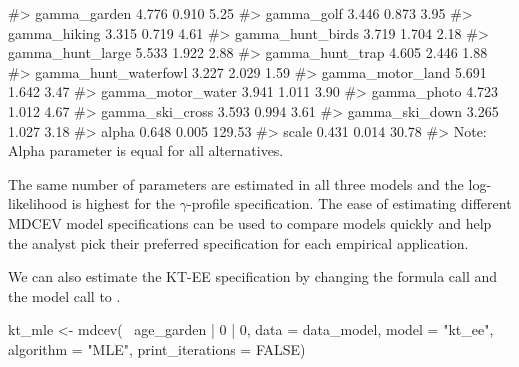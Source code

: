 \begin{Schunk}
\begin{Soutput}
#> gamma_garden            4.776   0.910   5.25
#> gamma_golf              3.446   0.873   3.95
#> gamma_hiking            3.315   0.719   4.61
#> gamma_hunt_birds        3.719   1.704   2.18
#> gamma_hunt_large        5.533   1.922   2.88
#> gamma_hunt_trap         4.605   2.446   1.88
#> gamma_hunt_waterfowl    3.227   2.029   1.59
#> gamma_motor_land        5.691   1.642   3.47
#> gamma_motor_water       3.941   1.011   3.90
#> gamma_photo             4.723   1.012   4.67
#> gamma_ski_cross         3.593   0.994   3.61
#> gamma_ski_down          3.265   1.027   3.18
#> alpha                   0.648   0.005 129.53
#> scale                   0.431   0.014  30.78
#> Note: Alpha parameter is equal for all alternatives.
\end{Soutput}
\end{Schunk}

The same number of parameters are estimated in all three models and the
log-likelihood is highest for the \(\gamma\)-profile specification. The
ease of estimating different MDCEV model specifications can be used to
compare models quickly and help the analyst pick their preferred
specification for each empirical application.

We can also estimate the KT-EE specification by changing the formula
call and the model call to .

\begin{Schunk}
\begin{Sinput}
kt_mle <- mdcev(~ age_garden | 0 | 0,
                   data = data_model,
                   model = "kt_ee",
                   algorithm = "MLE",
                   print_iterations = FALSE)
\end{Sinput}
\end{Schunk}

